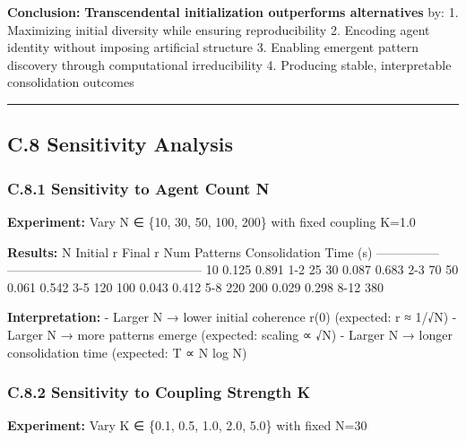 \documentclass[
]{article}
\begin{document}
\textbf{Conclusion:} \textbf{Transcendental initialization outperforms
alternatives} by: 1. Maximizing initial diversity while ensuring
reproducibility 2. Encoding agent identity without imposing artificial
structure 3. Enabling emergent pattern discovery through computational
irreducibility 4. Producing stable, interpretable consolidation outcomes

\begin{center}\rule{0.5\linewidth}{0.5pt}\end{center}

\subsection{C.8 Sensitivity Analysis}\label{c.8-sensitivity-analysis}

\subsubsection{C.8.1 Sensitivity to Agent Count
N}\label{c.8.1-sensitivity-to-agent-count-n}

\textbf{Experiment:} Vary N ∈ \{10, 30, 50, 100, 200\} with fixed
coupling K=1.0

\textbf{Results:} \textbar{} N \textbar{} Initial r \textbar{} Final r
\textbar{} Num Patterns \textbar{} Consolidation Time (s) \textbar{}
\textbar-----\textbar-----------\textbar---------\textbar--------------\textbar------------------------\textbar{}
\textbar{} 10 \textbar{} 0.125 \textbar{} 0.891 \textbar{} 1-2
\textbar{} 25 \textbar{} \textbar{} 30 \textbar{} 0.087 \textbar{} 0.683
\textbar{} 2-3 \textbar{} 70 \textbar{} \textbar{} 50 \textbar{} 0.061
\textbar{} 0.542 \textbar{} 3-5 \textbar{} 120 \textbar{} \textbar{} 100
\textbar{} 0.043 \textbar{} 0.412 \textbar{} 5-8 \textbar{} 220
\textbar{} \textbar{} 200 \textbar{} 0.029 \textbar{} 0.298 \textbar{}
8-12 \textbar{} 380 \textbar{}

\textbf{Interpretation:} - Larger N → lower initial coherence r(0)
(expected: r ≈ 1/√N) - Larger N → more patterns emerge (expected:
scaling ∝ √N) - Larger N → longer consolidation time (expected: T ∝ N
log N)

\subsubsection{C.8.2 Sensitivity to Coupling Strength
K}\label{c.8.2-sensitivity-to-coupling-strength-k}

\textbf{Experiment:} Vary K ∈ \{0.1, 0.5, 1.0, 2.0, 5.0\} with fixed
N=30
\end{document}
